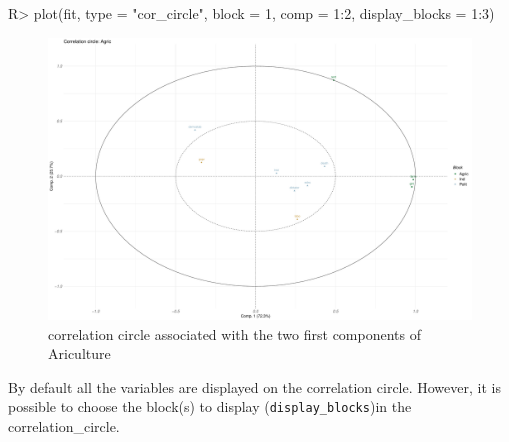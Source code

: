 \documentclass[
]{jss}
\begin{document}
\begin{CodeChunk}
\begin{CodeInput}
R> plot(fit, type = "cor_circle", block = 1, comp = 1:2, display_blocks = 1:3)
\end{CodeInput}
\begin{figure}

{\centering \includegraphics{RGCCA_vignette_files/figure-latex/unnamed-chunk-10-1} 

}

\caption[correlation circle associated with the two first components of Ariculture]{correlation circle associated with the two first components of Ariculture}\label{fig:unnamed-chunk-10}
\end{figure}
\end{CodeChunk}

\normalsize

By default all the variables are displayed on the correlation circle.
However, it is possible to choose the block(s) to display
(\texttt{display\_blocks})in the correlation\_circle.

\footnotesize
\end{document}
